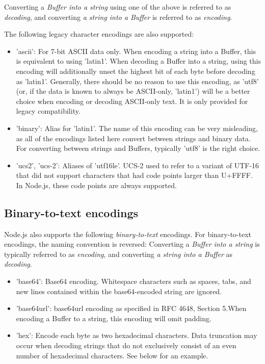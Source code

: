 \documentclass{scrartcl}
\begin{document}
Converting a \textit{Buffer into a string} using one of the above is referred to as \textit{decoding}, and converting \textit{a string into a Buffer} is referred to as \textit{encoding}.

The following legacy character encodings are also supported:

\begin{itemize}
    \item 'ascii': For 7-bit ASCII data only. When encoding a string into a Buffer, this is equivalent to using 'latin1'. When decoding a Buffer into a string, using this encoding will additionally unset the highest bit of each byte before decoding as 'latin1'. Generally, there should be no reason to use this encoding, as 'utf8' (or, if the data is known to always be ASCII-only, 'latin1') will be a better choice when encoding or decoding ASCII-only text. It is only provided for legacy compatibility.
    \item 'binary': Alias for 'latin1'. The name of this encoding can be very misleading, as all of the encodings listed here convert between strings and binary data. For converting between strings and Buffers, typically 'utf8' is the right choice.
    \item 'ucs2', 'ucs-2': Aliases of 'utf16le'. UCS-2 used to refer to a variant of UTF-16 that did not support characters that had code points larger than U+FFFF. In Node.js, these code points are always supported.
\end{itemize}


\subsection{Binary-to-text encodings}

Node.js also supports the following \textit{binary-to-text} encodings. For binary-to-text encodings, the naming convention is reversed: Converting a \textit{Buffer into a string} is typically referred to as \textit{encoding}, and converting \textit{a string into a Buffer} as \textit{decoding}.

\begin{itemize}
    \item 'base64': Base64 encoding. Whitespace characters such as spaces, tabs, and new lines contained within the base64-encoded string are ignored.
    \item 'base64url': base64url encoding as specified in RFC 4648, Section 5.When encoding a Buffer to a string, this encoding will omit padding.
    \item 'hex': Encode each byte as two hexadecimal characters. Data truncation may occur when decoding strings that do not exclusively consist of an even number of hexadecimal characters. See below for an example.
\end{itemize}
\end{document}
